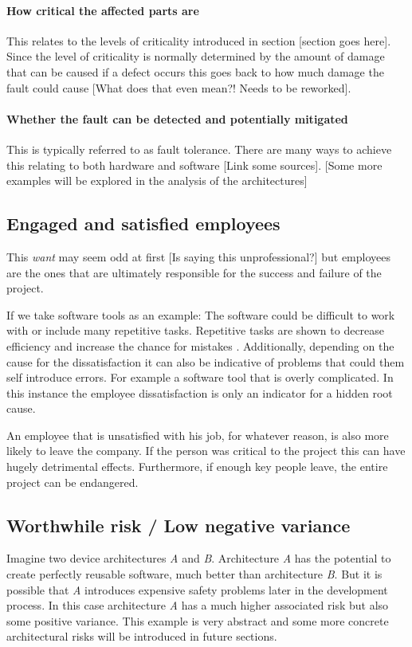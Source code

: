 \paragraph{How critical the affected parts are}
This relates to the levels of criticality introduced in section [section goes here]. Since the level of criticality is normally determined by the amount of damage that can be caused if a defect occurs this goes back to how much damage the fault could cause [What does that even mean?! Needs to be reworked]. 
\paragraph{Whether the fault can be detected and potentially mitigated}
This is typically referred to as fault tolerance. There are many ways to achieve this relating to both hardware and software [Link some sources]. [Some more examples will be explored in the analysis of the architectures]

\subsection{Engaged and satisfied employees}
This \textit{want} may seem odd at first [Is saying this unprofessional?] but employees are the ones that are ultimately responsible for the success and failure of the project.

If we take software tools as an example: The software could be difficult to work with or include many repetitive tasks. Repetitive tasks are shown to decrease efficiency and increase the chance for mistakes \cite{Wyatt.1937}. Additionally, depending on the cause for the dissatisfaction it can also be indicative of problems that could them self introduce errors. For example a software tool that is overly complicated. In this instance the employee dissatisfaction is only an indicator for a hidden root cause.

An employee that is unsatisfied with his job, for whatever reason, is also more likely to leave the company. If the person was critical to the project this can have hugely detrimental effects. Furthermore, if enough key people leave, the entire project can be endangered. 
\subsection{Worthwhile risk / Low negative variance}
Imagine two device architectures \textit{A} and \textit{B}. Architecture \textit{A} has the potential to create perfectly reusable software, much better than architecture \textit{B}. But it is possible that \textit{A} introduces expensive safety problems later in the development process.
In this case architecture \textit{A} has a much higher associated risk but also  some positive variance. This example is very abstract and some more concrete architectural risks will be introduced in future sections. 

